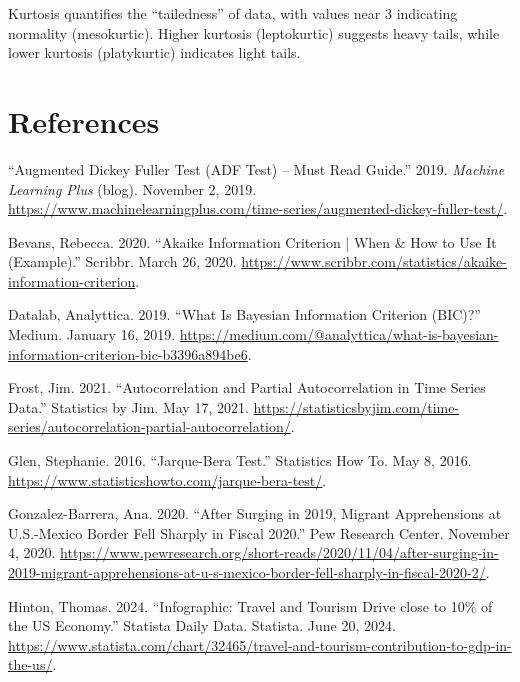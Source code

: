 \documentclass[11pt]{article}
\newenvironment{references}
  {\begin{list}{}{%
      \setlength{\leftmargin}{0.4in}%
      \setlength{\itemindent}{-0.4in}%
      \setlength{\itemsep}{0.6\baselineskip}%
      \setlength{\parsep}{0pt}%
  }}
  {\end{list}}
\begin{document}
Kurtosis quantifies the ``tailedness'' of data, with values near 3 indicating normality (mesokurtic). Higher kurtosis (leptokurtic) suggests heavy tails, while lower kurtosis (platykurtic) indicates light tails.

\clearpage

\section{References}

\begin{references}

\item ``Augmented Dickey Fuller Test (ADF Test) -- Must Read Guide.'' 2019. \emph{Machine Learning Plus} (blog). November 2, 2019. \url{https://www.machinelearningplus.com/time-series/augmented-dickey-fuller-test/}.

\item Bevans, Rebecca. 2020. ``Akaike Information Criterion | When \& How to Use It (Example).'' Scribbr. March 26, 2020. \url{https://www.scribbr.com/statistics/akaike-information-criterion}.

\item Datalab, Analyttica. 2019. ``What Is Bayesian Information Criterion (BIC)?'' Medium. January 16, 2019. \url{https://medium.com/@analyttica/what-is-bayesian-information-criterion-bic-b3396a894be6}.

\item Frost, Jim. 2021. ``Autocorrelation and Partial Autocorrelation in Time Series Data.'' Statistics by Jim. May 17, 2021. \url{https://statisticsbyjim.com/time-series/autocorrelation-partial-autocorrelation/}.

\item Glen, Stephanie. 2016. ``Jarque-Bera Test.'' Statistics How To. May 8, 2016. \url{https://www.statisticshowto.com/jarque-bera-test/}.

\item Gonzalez-Barrera, Ana. 2020. ``After Surging in 2019, Migrant Apprehensions at U.S.-Mexico Border Fell Sharply in Fiscal 2020.'' Pew Research Center. November 4, 2020. \url{https://www.pewresearch.org/short-reads/2020/11/04/after-surging-in-2019-migrant-apprehensions-at-u-s-mexico-border-fell-sharply-in-fiscal-2020-2/}.

\item Hinton, Thomas. 2024. ``Infographic: Travel and Tourism Drive close to 10\% of the US Economy.'' Statista Daily Data. Statista. June 20, 2024. \url{https://www.statista.com/chart/32465/travel-and-tourism-contribution-to-gdp-in-the-us/}.


\end{references}
\end{document}
